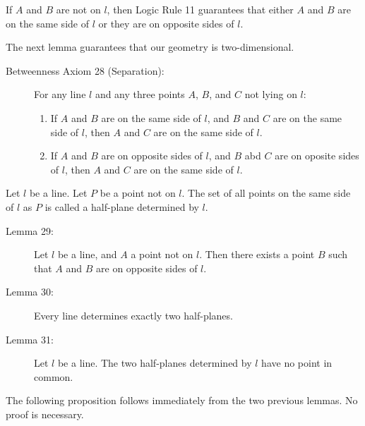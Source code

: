 \documentclass{article}
\begin{document}
If $A$ and $B$ are not on $l$, then Logic Rule 11 guarantees that either $A$ and $B$ are on the same side of $l$ or they are on opposite sides of $l$.

\vspace{0.3cm}

The next lemma guarantees that our geometry is two-dimensional.

\begin{description}

\item[Betweenness Axiom 28 (Separation):] For any line $l$ and any three points $A$, $B$, and $C$ not lying on $l$:
\begin{enumerate}[\hspace{1cm}1.]
  \item If $A$ and $B$ are on the same side of $l$, and $B$ and $C$ are on the same side of $l$, then $A$ and $C$ are on the same side of $l$.
  \item If $A$ and $B$ are on opposite sides of $l$, and $B$ abd $C$ are on oposite sides of $l$, then $A$ and $C$ are on the same side of $l$.
\end{enumerate}

\end{description}

Let $l$ be a line. Let $P$ be a point not on $l$. The set of all points on the same side of $l$ as $P$ is called a half-plane determined by $l$.

\begin{description}

\item[Lemma 29:] Let $l$ be a line, and $A$ a point not on $l$. Then there exists a point $B$ such that $A$ and $B$ are on opposite sides of $l$.

\item[Lemma 30:] Every line determines exactly two half-planes.

\item[Lemma 31:] Let $l$ be a line. The two half-planes determined by $l$ have no point in common.

\end{description}

The following proposition follows immediately from the two previous lemmas. No proof is necessary.
\end{document}
